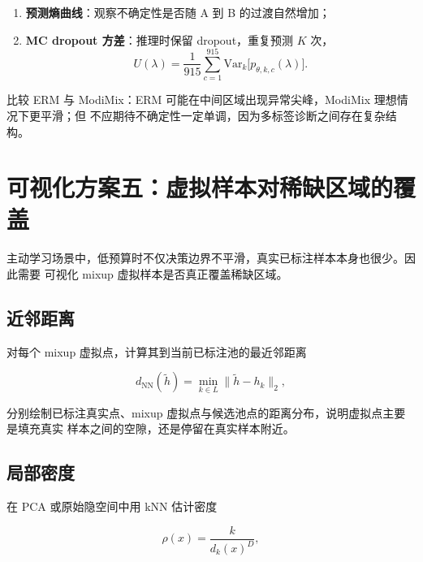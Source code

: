 \documentclass[11pt,a4paper]{article}
\theoremstyle{definition}
\begin{document}
\begin{enumerate}[itemsep=1pt]
  \item \textbf{预测熵曲线}：观察不确定性是否随 A 到 B 的过渡自然增加；
  \item \textbf{MC dropout 方差}：推理时保留 dropout，重复预测 $K$ 次，
        \begin{equation}
          U(\lambda)=\frac{1}{915}\sum_{c=1}^{915}
          \mathrm{Var}_{k}\bigl[p_{\theta,k,c}(\lambda)\bigr].
          \label{eq:mc-var}
        \end{equation}
\end{enumerate}

比较 ERM 与 ModiMix：ERM 可能在中间区域出现异常尖峰，ModiMix 理想情况下更平滑；但
不应期待不确定性一定单调，因为多标签诊断之间存在复杂结构。

\section{可视化方案五：虚拟样本对稀缺区域的覆盖}
\label{sec:vis-coverage}

主动学习场景中，低预算时不仅决策边界不平滑，真实已标注样本本身也很少。因此需要
可视化 mixup 虚拟样本是否真正覆盖稀缺区域。

\subsection{近邻距离}

对每个 mixup 虚拟点，计算其到当前已标注池的最近邻距离

\begin{equation}
  d_{\text{NN}}(\tilde{h})=\min_{k\in L}\lVert\tilde{h}-h_k\rVert_2,
  \label{eq:nn-dist}
\end{equation}

分别绘制已标注真实点、mixup 虚拟点与候选池点的距离分布，说明虚拟点主要是填充真实
样本之间的空隙，还是停留在真实样本附近。

\subsection{局部密度}

在 PCA 或原始隐空间中用 kNN 估计密度

\begin{equation}
  \rho(x)=\frac{k}{d_k(x)^{D}},
  \label{eq:density}
\end{equation}
\end{document}
